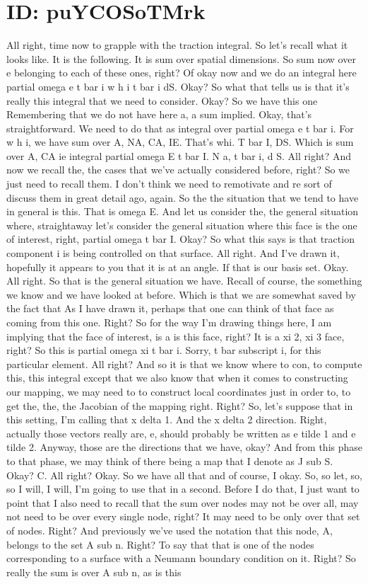 \documentclass[10pt]{article}
\begin{document}
\section*{ID: puYCOSoTMrk}
All right, time now to grapple with the traction integral. So let's recall what it looks like. It is the following. It is sum over spatial dimensions. So sum now over e belonging to each of these ones, right? Of okay now and we do an integral here partial omega e t bar i w h i t bar i dS. Okay? So what that tells us is that it's really this integral that we need to consider. Okay? So we have this one Remembering that we do not have here a, a sum implied. Okay, that's straightforward. We need to do that as integral over partial omega e t bar i. For w h i, we have sum over A, NA, CA, IE. That's whi. T bar I, DS. Which is sum over A, CA ie integral partial omega E t bar I. N a, t bar i, d S. All right? And now we recall the, the cases that we've actually considered before, right? So we just need to recall them. I don't think we need to remotivate and re sort of discuss them in great detail ago, again. So the the situation that we tend to have in general is this. That is omega E. And let us consider the, the general situation where, straightaway let's consider the general situation where this face is the one of interest, right, partial omega t bar I. Okay? So what this says is that traction component i is being controlled on that surface. All right. And I've drawn it, hopefully it appears to you that it is at an angle. If that is our basis set. Okay. All right. So that is the general situation we have. Recall of course, the something we know and we have looked at before. Which is that we are somewhat saved by the fact that As I have drawn it, perhaps that one can think of that face as coming from this one. Right? So for the way I'm drawing things here, I am implying that the face of interest, is a is this face, right? It is a xi 2, xi 3 face, right? So this is partial omega xi t bar i. Sorry, t bar subscript i, for this particular element. All right?  And so it is that we know where to con, to compute this, this integral except that we also know that when it comes to constructing our mapping, we may need to to construct local coordinates just in order to, to get the, the, the Jacobian of the mapping right. Right? So, let's suppose that in this setting, I'm calling that x delta 1. And the x delta 2 direction. Right, actually those vectors really are, e, should probably be written as e tilde 1 and e tilde 2. Anyway, those are the directions that we have, okay? And from this phase to that phase, we may think of there being a map that I denote as J sub S. Okay? C. All right? Okay. So we have all that and of course, I okay. So, so let, so, so I will, I will, I'm going to use that in a second. Before I do that, I just want to point that I also need to recall that the sum over nodes may not be over all, may not need to be over every single node, right? It may need to be only over that set of nodes. Right? And previously we've used the notation that this node, A, belongs to the set A sub n. Right? To say that that is one of the nodes corresponding to a surface with a Neumann boundary condition on it. Right? So really the sum is over A sub n, as is this 
\end{document}
